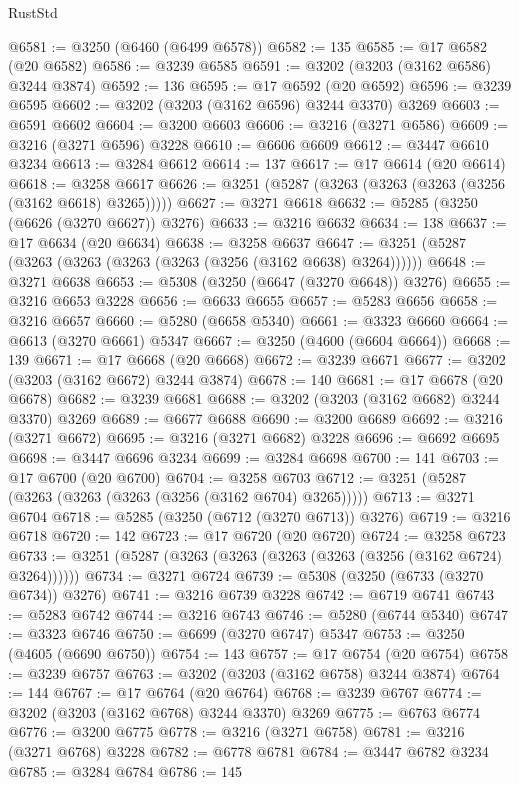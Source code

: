 \begin{lexlean}{RustStd}
\begin{coremodule}
@6581 := @3250 (@6460 (@6499 @6578))
@6582 := 135
@6585 := @17 @6582 (@20 @6582)
@6586 := @3239 @6585
@6591 := @3202 (@3203 (@3162 @6586) @3244 @3874)
@6592 := 136
@6595 := @17 @6592 (@20 @6592)
@6596 := @3239 @6595
@6602 := @3202 (@3203 (@3162 @6596) @3244 @3370) @3269
@6603 := @6591 @6602
@6604 := @3200 @6603
@6606 := @3216 (@3271 @6586)
@6609 := @3216 (@3271 @6596) @3228
@6610 := @6606 @6609
@6612 := @3447 @6610 @3234
@6613 := @3284 @6612
@6614 := 137
@6617 := @17 @6614 (@20 @6614)
@6618 := @3258 @6617
@6626 := @3251 (@5287 (@3263 (@3263 (@3263 (@3256 (@3162 @6618) @3265)))))
@6627 := @3271 @6618
@6632 := @5285 (@3250 (@6626 (@3270 @6627)) @3276)
@6633 := @3216 @6632
@6634 := 138
@6637 := @17 @6634 (@20 @6634)
@6638 := @3258 @6637
@6647 := @3251 (@5287 (@3263 (@3263 (@3263 (@3263 (@3256 (@3162 @6638) @3264))))))
@6648 := @3271 @6638
@6653 := @5308 (@3250 (@6647 (@3270 @6648)) @3276)
@6655 := @3216 @6653 @3228
@6656 := @6633 @6655
@6657 := @5283 @6656
@6658 := @3216 @6657
@6660 := @5280 (@6658 @5340)
@6661 := @3323 @6660
@6664 := @6613 (@3270 @6661) @5347
@6667 := @3250 (@4600 (@6604 @6664))
@6668 := 139
@6671 := @17 @6668 (@20 @6668)
@6672 := @3239 @6671
@6677 := @3202 (@3203 (@3162 @6672) @3244 @3874)
@6678 := 140
@6681 := @17 @6678 (@20 @6678)
@6682 := @3239 @6681
@6688 := @3202 (@3203 (@3162 @6682) @3244 @3370) @3269
@6689 := @6677 @6688
@6690 := @3200 @6689
@6692 := @3216 (@3271 @6672)
@6695 := @3216 (@3271 @6682) @3228
@6696 := @6692 @6695
@6698 := @3447 @6696 @3234
@6699 := @3284 @6698
@6700 := 141
@6703 := @17 @6700 (@20 @6700)
@6704 := @3258 @6703
@6712 := @3251 (@5287 (@3263 (@3263 (@3263 (@3256 (@3162 @6704) @3265)))))
@6713 := @3271 @6704
@6718 := @5285 (@3250 (@6712 (@3270 @6713)) @3276)
@6719 := @3216 @6718
@6720 := 142
@6723 := @17 @6720 (@20 @6720)
@6724 := @3258 @6723
@6733 := @3251 (@5287 (@3263 (@3263 (@3263 (@3263 (@3256 (@3162 @6724) @3264))))))
@6734 := @3271 @6724
@6739 := @5308 (@3250 (@6733 (@3270 @6734)) @3276)
@6741 := @3216 @6739 @3228
@6742 := @6719 @6741
@6743 := @5283 @6742
@6744 := @3216 @6743
@6746 := @5280 (@6744 @5340)
@6747 := @3323 @6746
@6750 := @6699 (@3270 @6747) @5347
@6753 := @3250 (@4605 (@6690 @6750))
@6754 := 143
@6757 := @17 @6754 (@20 @6754)
@6758 := @3239 @6757
@6763 := @3202 (@3203 (@3162 @6758) @3244 @3874)
@6764 := 144
@6767 := @17 @6764 (@20 @6764)
@6768 := @3239 @6767
@6774 := @3202 (@3203 (@3162 @6768) @3244 @3370) @3269
@6775 := @6763 @6774
@6776 := @3200 @6775
@6778 := @3216 (@3271 @6758)
@6781 := @3216 (@3271 @6768) @3228
@6782 := @6778 @6781
@6784 := @3447 @6782 @3234
@6785 := @3284 @6784
@6786 := 145

\end{coremodule}
\end{lexlean}
